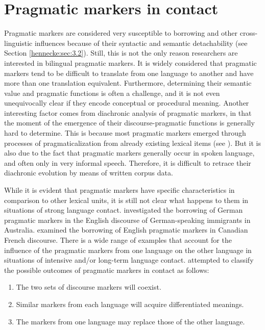 \documentclass[output=paper]{langscibook}
\begin{document}
\section{Pragmatic markers in contact}\label{hennecke:sec:2}
Pragmatic markers are considered very susceptible to borrowing and other cross-linguistic influences because of their syntactic and semantic detachability (see Section \ref{hennecke:sec:3.2}). Still, this is not the only reason researchers are interested in bilingual pragmatic markers. It is widely considered that pragmatic markers tend to be difficult to translate from one language to another and have more than one translation equivalent. Furthermore, determining their semantic value and pragmatic functions is often a challenge, and it is not even unequivocally clear if they encode conceptual or procedural meaning. Another interesting factor comes from diachronic analysis of pragmatic markers, in that the moment of the emergence of their discourse-pragmatic functions is generally hard to determine. This is because most pragmatic markers emerged through processes of pragmaticalization from already existing lexical items (see \citealt{Aijmer.1997, Dostie.2004}). But it is also due to the fact that pragmatic markers generally occur in spoken language, and often only in very informal speech. Therefore, it is difficult to retrace their diachronic evolution by means of written corpus data. 

While it is evident that pragmatic markers have specific characteristics in comparison to other lexical units, it is still not clear what happens to them in situations of strong language contact. \citet{Clyne.1972} investigated the borrowing of German pragmatic markers in the English discourse of German-speaking immigrants in Australia. \citet{Mougeon.1991} examined the borrowing of English pragmatic markers in Canadian French discourse. There is a wide range of examples that account for the influence of the pragmatic markers from one language on the other language in situations of intensive and/or long-term language contact. \citet[264]{Torres.2008} attempted to classify the possible outcomes of pragmatic markers in contact as follows:

\begin{enumerate}
    \item The two sets of discourse markers will coexist.
    \item Similar markers from each language will acquire differentiated meanings.
    \item The markers from one language may replace those of the other language.
\end{enumerate}
\end{document}

